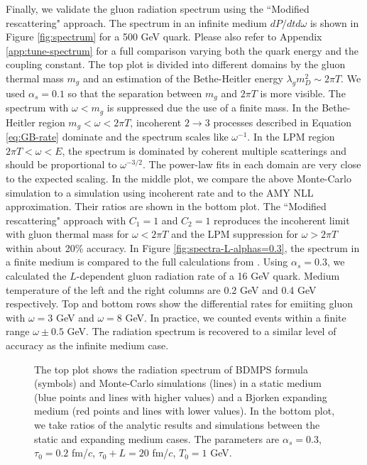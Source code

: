 \documentclass[aps, prc, reprint, amsmath, groupedaddress, nofootinbib]{revtex4-1}
\begin{document}
{Finally, we validate the gluon radiation spectrum using the ``Modified rescattering" approach. 
The spectrum in an infinite medium $dP/dtd\omega$ is shown in Figure \ref{fig:spectrum} for a 500 GeV quark.
Please also refer to Appendix \ref{app:tune-spectrum} for a full comparison varying both the quark energy and the coupling constant.
The top plot is divided into different domains by the gluon thermal mass $m_g$ and an estimation of the Bethe-Heitler energy $\lambda_g m_D^2 \sim 2\pi T$.
We used $\alpha_s = 0.1$ so that the separation between $m_g$ and $2\pi T$ is more visible.
The spectrum with $\omega < m_g$ is suppressed due the use of a finite mass.
In the Bethe-Heitler region $m_g < \omega < 2\pi T$, incoherent $2\rightarrow 3$ processes described in Equation \ref{eq:GB-rate} dominate and the spectrum scales like $\omega^{-1}$.
In the LPM region $2\pi T < \omega < E$, the spectrum is dominated by coherent multiple scatterings and should be proportional to $\omega^{-3/2}$.
The power-law fits in each domain are very close to the expected scaling.
In the middle plot, we compare the above Monte-Carlo simulation to a simulation using incoherent rate and to the AMY NLL approximation. 
Their ratios are shown in the bottom plot.
The ``Modified rescattering" approach with $C_1 = 1$ and $C_2 = 1$ reproduces the incoherent limit with gluon thermal mass for $\omega < 2\pi T$ and the LPM suppression for $\omega > 2\pi T$ within about 20\% accuracy.
In Figure \ref{fig:spectra-L-alphas=0.3}, the spectrum in a finite medium is compared to the full calculations from \cite{CaronHuot:2008uh}.
Using $\alpha_s = 0.3$, we calculated the $L$-dependent gluon radiation rate of a 16 GeV quark.
Medium temperature of the left and the right columns are 0.2 GeV and 0.4 GeV respectively.
Top and bottom rows show the differential rates for emiiting gluon with $\omega = 3$ GeV and $\omega = 8$ GeV. 
In practice, we counted events within a finite range $\omega\pm 0.5$ GeV.
The radiation spectrum is recovered to a similar level of accuracy as the infinite medium case.

\begin{figure}
\caption{The top plot shows the radiation spectrum of BDMPS formula (symbols) and Monte-Carlo simulations (lines) in a static medium (blue points and lines with higher values) and a Bjorken expanding medium (red points and lines with lower values). In the bottom plot, we take ratios of the analytic results and simulations between the static and expanding medium cases. The parameters are $\alpha_s=0.3$, $\tau_0 = 0.2$ fm/$c$, $\tau_0+L = 20$ fm/$c$, $T_0 = 1$ GeV.}
\label{fig:Bjorken-BDMPS}
\end{figure}

}
\end{document}
